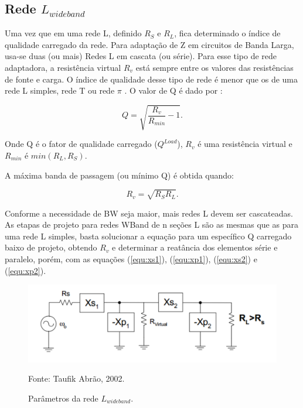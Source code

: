 \subsection{Rede $L_{wideband}$}\label{subsec:lwb}

Uma vez que em uma rede L, definido $R_S$ e $R_L$, fica determinado o índice de qualidade carregado da rede. Para adaptação de Z em circuitos de Banda Larga, usa-se duas (ou mais) Redes L em cascata (ou série). Para esse tipo de rede adaptadora, a resistência virtual $R_v$ está sempre entre os valores das resistências de fonte e carga. O índice de qualidade desse tipo de rede é menor que os de uma rede L simples, rede T ou rede $\pi$ . O valor de Q \cite{abrao} é dado por :

\begin{equation}
Q = \sqrt{\frac{R_v}{R_{min}} -1 }.
\label{equ:qlwb}
\end{equation}

Onde Q é o fator de qualidade carregado ($Q^{Load}$), $R_v$ é uma resistência virtual e $R_{min}$ é $min(R_L, R_S)$.

A máxima banda de passagem (ou mínimo Q) é obtida quando:

\begin{equation}
R_v = \sqrt{R_SR_L}.
\end{equation}

Conforme a necessidade de BW seja maior, mais redes L devem ser cascateadas.
As etapas de projeto para redes WBand de n seções L são as mesmas que as para uma rede L simples, basta solucionar a equação para um específico Q carregado baixo de projeto, obtendo $R_v$ e determinar a reatância dos elementos série e paralelo, porém, com as equações (\ref{equ:xs1}), (\ref{equ:xp1}), (\ref{equ:xs2}) e (\ref{equ:xp2}).

\begin{figure}[H]
    \centering
    \caption{Parâmetros da rede $L_{wideband}$.}
    \includegraphics[scale=0.3]{Imagens/fig3.png}
    \label{f_fig3}
    
    \small Fonte: Taufik Abrão, 2002.
\end{figure}


